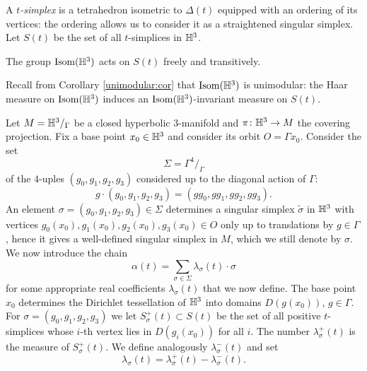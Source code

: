 A \emph{$t$-simplex} is a tetrahedron isometric to $\Delta(t)$ equipped with an ordering of its vertices: the ordering allows us to consider it as a straightened singular simplex. Let $S(t)$ be the set of all $t$-simplices in $\mathbb{H}^3$.

\begin{ex} The group ${\rm Isom}(\mathbb{H}^3)$ acts on $S(t)$ freely and transitively.
\end{ex}

Recall from Corollary \ref{unimodular:cor} that ${\rm Isom}(\mathbb{H}^3)$ is unimodular:
the Haar measure on ${\rm Isom}(\mathbb{H}^3)$ induces an ${\rm Isom}(\mathbb{H}^3)$-invariant measure on $S(t)$. 

Let $M=\mathbb{H}^3/_\Gamma$ be a closed hyperbolic 3-manifold and $\pi\colon\mathbb{H}^3 \to M$ the covering projection. Fix a base point $x_0 \in \mathbb{H}^3$ and consider its orbit $O=\Gamma x_0$. Consider the set
$$\Sigma = \Gamma^{4}/_\Gamma$$
of the $4$-uples $(g_0,g_1,g_2, g_3)$ considered up to the diagonal action of $\Gamma$:
$$g \cdot (g_0,g_1,g_2, g_3) = (g g_0,gg_1, gg_2, g g_3).$$
An element $\sigma = (g_0,g_1,g_2, g_3) \in \Sigma$ determines a singular simplex $\tilde\sigma$ in $\mathbb{H}^3$ with vertices $g_0(x_0), g_1(x_0), g_2(x_0), g_3(x_0)\in O$ only up to translations by $g\in\Gamma$, hence it gives a well-defined singular simplex in $M$, which we still denote by $\sigma$. We now introduce the chain
$$\alpha(t) = \sum_{\sigma \in \Sigma} \lambda_\sigma(t) \cdot \sigma$$
for some appropriate real coefficients $\lambda_\sigma(t)$ that we now define. The base point $x_0$ determines the Dirichlet tessellation of $\mathbb{H}^3$ into domains $D(g(x_0))$, $g\in\Gamma$. For $\sigma = (g_0,g_1,g_2, g_3)$ we let $S^+_\sigma(t)\subset S(t)$ be the set of all positive $t$-simplices whose $i$-th vertex lies in $D(g_i(x_0))$ for all $i$. The number $\lambda^+_\sigma(t)$ is the measure of $S^+_\sigma(t)$. We define analogously $\lambda^-_\sigma(t)$ and set
$$\lambda_\sigma(t) = \lambda^+_\sigma(t) - \lambda^-_\sigma(t).$$

